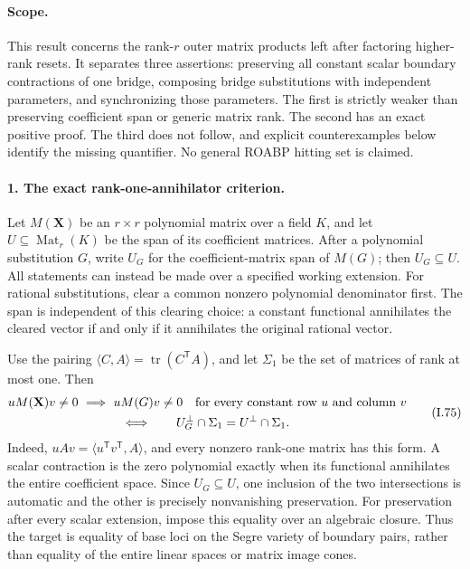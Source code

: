 \paragraph{Scope.}
This result concerns the rank-$r$ outer matrix products left after
factoring higher-rank resets. It separates three assertions:
preserving all constant scalar boundary contractions of one bridge,
composing bridge substitutions with independent parameters, and
synchronizing those parameters. The first is strictly weaker than
preserving coefficient span or generic matrix rank. The second has
an exact positive proof. The third does not follow, and explicit
counterexamples below identify the missing quantifier. No general
ROABP hitting set is claimed.

\paragraph{1. The exact rank-one-annihilator criterion.}
Let $M(\mathbf X)$ be an $r\times r$ polynomial matrix over a field
$K$, and let $U\subseteq\operatorname{Mat}_r(K)$ be the span of its
coefficient matrices. After a polynomial substitution $G$, write
$U_G$ for the coefficient-matrix span of $M(G)$; then $U_G\subseteq U$.
All statements can instead be made over a specified working extension.
For rational substitutions, clear a common nonzero polynomial
denominator first. The span is independent of this clearing choice:
a constant functional annihilates the cleared vector if and only if
it annihilates the original rational vector.

Use the pairing $\langle C,A\rangle=\operatorname{tr}(C^{\mathsf T}A)$,
and let $\Sigma_1$ be the set of matrices of rank at most one. Then
\[
 \begin{gathered}
 uM(\mathbf X)v\ne0\ \Longrightarrow\ uM(G)v\ne0
       \quad\hbox{for every constant row }u\hbox{ and column }v
 \\
 \Longleftrightarrow\qquad
 U_G^\perp\cap\Sigma_1=U^\perp\cap\Sigma_1.
 \end{gathered}
 \tag{I.75}
\]
Indeed, $uAv=\langle u^{\mathsf T}v^{\mathsf T},A\rangle$, and every
nonzero rank-one matrix has this form. A scalar contraction is the
zero polynomial exactly when its functional annihilates the entire
coefficient space. Since $U_G\subseteq U$, one inclusion of the two
intersections is automatic and the other is precisely nonvanishing
preservation. For preservation after every scalar extension, impose
this equality over an algebraic closure. Thus the target is equality
of base loci on the Segre variety of boundary pairs, rather than
equality of the entire linear spaces or matrix image cones.

